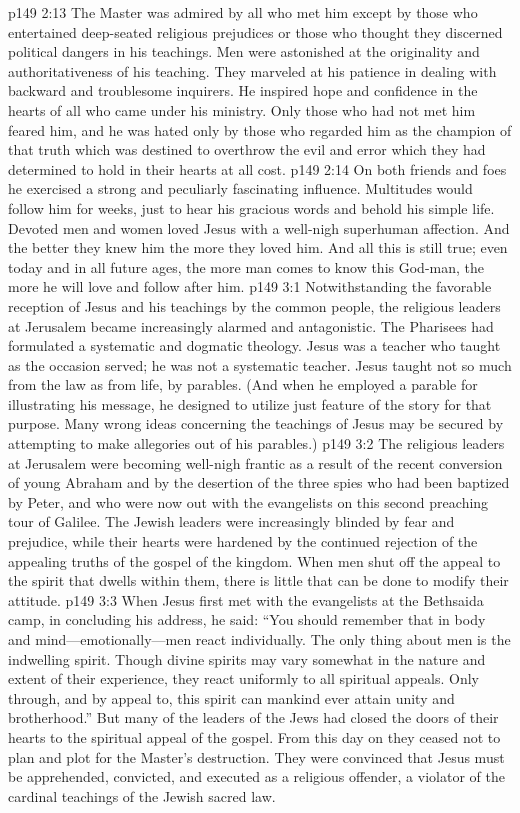 \vs p149 2:13 The Master was admired by all who met him except by those who entertained deep\hyp{}seated religious prejudices or those who thought they discerned political dangers in his teachings. Men were astonished at the originality and authoritativeness of his teaching. They marveled at his patience in dealing with backward and troublesome inquirers. He inspired hope and confidence in the hearts of all who came under his ministry. Only those who had not met him feared him, and he was hated only by those who regarded him as the champion of that truth which was destined to overthrow the evil and error which they had determined to hold in their hearts at all cost.\plusone
\vs p149 2:14 On both friends and foes he exercised a strong and peculiarly fascinating influence. Multitudes would follow him for weeks, just to hear his gracious words and behold his simple life. Devoted men and women loved Jesus with a well\hyp{}nigh superhuman affection. And the better they knew him the more they loved him. And all this is still true; even today and in all future ages, the more man comes to know this God\hyp{}man, the more he will love and follow after him.
\vs p149 3:1 Notwithstanding the favorable reception of Jesus and his teachings by the common people, the religious leaders at Jerusalem became increasingly alarmed and antagonistic. The Pharisees had formulated a systematic and dogmatic theology. Jesus was a teacher who taught as the occasion served; he was not a systematic teacher. Jesus taught not so much from the law as from life, by parables. (And when he employed a parable for illustrating his message, he designed to utilize just  feature of the story for that purpose. Many wrong ideas concerning the teachings of Jesus may be secured by attempting to make allegories out of his parables.)
\vs p149 3:2 The religious leaders at Jerusalem were becoming well\hyp{}nigh frantic as a result of the recent conversion of young Abraham and by the desertion of the three spies who had been baptized by Peter, and who were now out with the evangelists on this second preaching tour of Galilee. The Jewish leaders were increasingly blinded by fear and prejudice, while their hearts were hardened by the continued rejection of the appealing truths of the gospel of the kingdom. When men shut off the appeal to the spirit that dwells within them, there is little that can be done to modify their attitude.
\vs p149 3:3 When Jesus first met with the evangelists at the Bethsaida camp, in concluding his address, he said: \textcolor{ubdarkred}{“You should remember that in body and mind---emotionally---men react individually. The only  thing about men is the indwelling spirit. Though divine spirits may vary somewhat in the nature and extent of their experience, they react uniformly to all spiritual appeals. Only through, and by appeal to, this spirit can mankind ever attain unity and brotherhood.”} But many of the leaders of the Jews had closed the doors of their hearts to the spiritual appeal of the gospel. From this day on they ceased not to plan and plot for the Master’s destruction. They were convinced that Jesus must be apprehended, convicted, and executed as a religious offender, a violator of the cardinal teachings of the Jewish sacred law.
